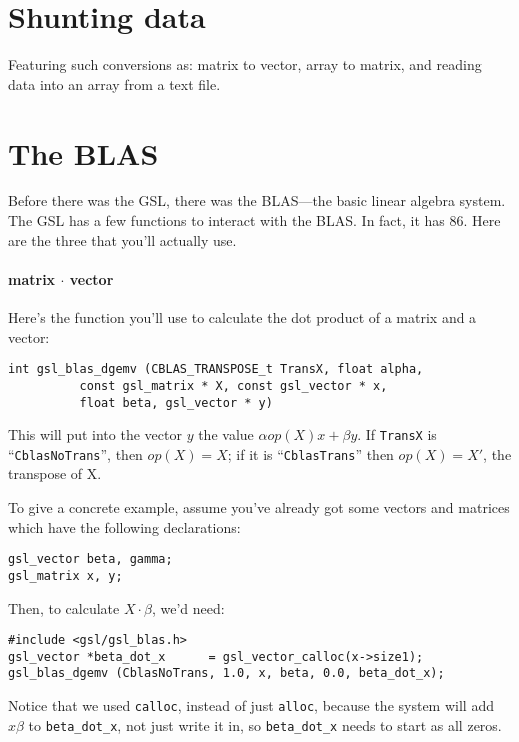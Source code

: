 \section{Shunting data} \label{asst_conversions}  

Featuring such conversions as: matrix to vector, array to matrix, and reading data into an array from a
text file.


\section{The BLAS} 
Before there was the GSL, there was the BLAS---the basic linear algebra system. The GSL has a few
functions to interact with the BLAS. In fact, it has 86. Here are the three that you'll
actually use.

\paragraph{matrix $\cdot$ vector} Here's the function you'll use to calculate the dot product of a
matrix and a vector:
\begin{verbatim}
int gsl_blas_dgemv (CBLAS_TRANSPOSE_t TransX, float alpha, 
          const gsl_matrix * X, const gsl_vector * x, 
          float beta, gsl_vector * y)
\end{verbatim}

This will put into the vector $y$ the value $\alpha op(X) x + \beta y$. 
If {\tt TransX} is ``{\tt CblasNoTrans}'',  then $op(X)=X$; if it is
``{\tt CblasTrans}'' then $op(X)=X'$, the transpose of X.


To give a concrete example, assume you've already got some vectors and matrices which have the following
declarations:
\begin{verbatim}
gsl_vector beta, gamma;     
gsl_matrix x, y;           
\end{verbatim}

Then, to calculate $X\cdot \beta$, we'd need:

\begin{verbatim}
#include <gsl/gsl_blas.h>
gsl_vector *beta_dot_x      = gsl_vector_calloc(x->size1);
gsl_blas_dgemv (CblasNoTrans, 1.0, x, beta, 0.0, beta_dot_x);
\end{verbatim}

Notice that we used {\tt calloc}, instead of just {\tt alloc}, because
the system will add $x\beta$ to {\tt beta\_dot\_x}, not just write it in,
so {\tt beta\_dot\_x} needs to start as all zeros.

